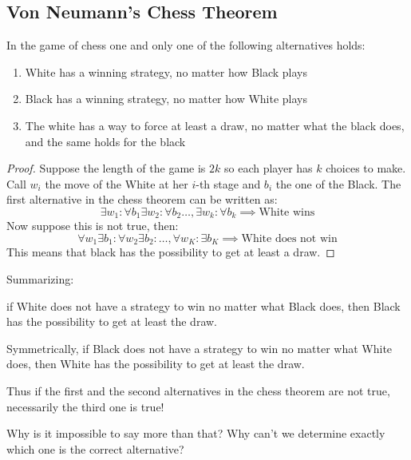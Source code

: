 \documentclass[../main.tex]{subfiles}
\begin{document}
\subsection{Von Neumann's Chess Theorem}
\vspace{0.25cm}
\begin{theorem}
    In the game of chess one and only one of the following alternatives holds:
    \begin{enumerate}
        \item White has a winning strategy, no matter how Black plays
        \item Black has a winning strategy, no matter how White plays
        \item The white has a way to force at least a draw, no matter what the black does, and the same holds for the black
    \end{enumerate}
\end{theorem}

\begin{proof}
    Suppose the length of the game is $2k$ so each player has $k$ choices to make.
    Call $w_i$ the move of the White at her $i$-th stage and $b_i$ the one of the Black.
    The first alternative in the chess theorem can be written as:
    \begin{equation*}
        \exists w_1 : \forall b_1 \exists w_2 : \forall b_2 \ldots, \exists w_k : \forall b_k \implies \text{White wins}
    \end{equation*}
    Now suppose this is not true, then:
    \begin{equation*}
        \forall w_1\exists b_1 :  \forall w_2 \exists b_2 : \ldots, \forall w_K : \exists b_K \implies \text{White does not win}
    \end{equation*}
    This means that black has the possibility to get at least a draw.
\end{proof}

Summarizing:

if White does not have a strategy to win no matter what Black does, then Black has the possibility to get at least the draw.

Symmetrically, if Black does not have a strategy to win no matter what White does, then White has the possibility to get at least the draw.

Thus if the first and the second alternatives in the chess theorem are not true, necessarily the third one is true!

Why is it impossible to say more than that? Why can’t we determine exactly
which one is the correct alternative?
\end{document}
